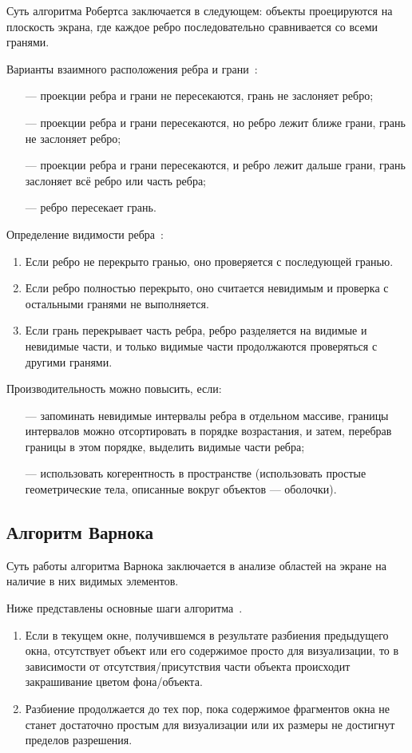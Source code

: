 Суть алгоритма Робертса заключается в следующем: объекты проецируются на плоскость экрана, где каждое ребро последовательно сравнивается со всеми гранями. 

Варианты взаимного расположения ребра и грани~\cite{rodjers}:
\begin{itemize}
	\item[---] проекции ребра и грани не пересекаются, грань не заслоняет ребро;
	\item[---] проекции ребра и грани пересекаются, но ребро лежит ближе грани, грань не заслоняет ребро;
	\item[---] проекции ребра и грани пересекаются, и ребро лежит дальше грани, грань заслоняет всё ребро или часть ребра;
	\item[---] ребро пересекает грань. 
\end{itemize}

Определение видимости ребра~\cite{rodjers}:
\begin{enumerate}
	\item Если ребро не перекрыто гранью, оно проверяется с последующей гранью.
	\item Если ребро полностью перекрыто, оно считается невидимым и проверка с остальными гранями не выполняется.
	\item Если грань перекрывает часть ребра, ребро разделяется на видимые и невидимые части, и только видимые части продолжаются проверяться с другими гранями.
\end{enumerate}

Производительность можно повысить, если:
\begin{itemize} 
	\item[---] запоминать невидимые интервалы ребра в отдельном массиве, границы интервалов можно отсортировать в порядке возрастания, и затем, перебрав границы в этом порядке, выделить видимые части ребра;
	\item[---] использовать когерентность в пространстве (использовать простые геометрические тела, описанные вокруг объектов --- оболочки).
\end{itemize}

\subsection{Алгоритм Варнока}

Суть работы алгоритма Варнока заключается в анализе областей на экране на наличие в них видимых элементов.

Ниже представлены основные шаги алгоритма~\cite{varnok}.
\begin{enumerate} 
	\item Если в текущем окне, получившемся в результате разбиения предыдущего окна, отсутствует объект или его содержимое просто для визуализации, то в зависимости от отсутствия/присутствия части объекта происходит закрашивание цветом фона/объекта.
	\item Разбиение продолжается до тех пор, пока содержимое фрагментов окна не станет достаточно простым для визуализации или их размеры не достигнут пределов разрешения.
\end{enumerate}

